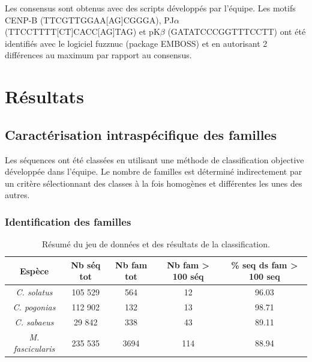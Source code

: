 \documentclass[12pt,a4paper]{article}
\begin{document}
Les consensus sont obtenus avec des scripts développés par l'équipe. Les motifs CENP-B (TTCGTTGGAA[AG]CGGGA), PJ$\alpha$ (TTCCTTTT[CT]CACC[AG]TAG) et pK$\beta$ (GATATCCCGGTTTCCTT) ont été identifiés avec le logiciel fuzznuc (package EMBOSS) \cite{Rice2000} et en autorisant 2 différences au maximum par rapport au consensus.

\section{Résultats}
	\subsection{Caractérisation intraspécifique des familles}
	Les séquences ont été classées en utilisant une méthode de classification objective développée dans l'équipe. Le nombre de familles est déterminé indirectement par un critère sélectionnant des classes à la fois homogènes et différentes les unes des autres.
	
			\subsubsection{Identification des familles}
	
				\begin{table}
			\caption{Résumé du jeu de données et des résultats de la classification.}
			\center
			\begin{tabular}{|c|c|c|c|c|}
   			\hline
  			\textbf{Espèce} & \textbf{Nb séq tot} & \textbf{Nb fam tot} & \textbf{Nb fam > 100 séq} & \textbf{\%  seq ds fam > 100 seq}\\
  		    \hline
   			\textit{C. solatus} & 105 529 & 564 & 12 & 96.03  \\
   			\hline
    		\textit{C. pogonias} & 112 902 & 132 & 13 & 98.71\\
   			\hline
   			\textit{C. sabaeus} & 29 842 & 338 & 43 & 89.11\\
   			\hline
   			\textit{M. fascicularis} & 235 535 & 3694 & 114 & 88.94\\
   			\hline			
			\end{tabular}
			
			\label{tab_res}
		\end{table}
		
\end{document}
